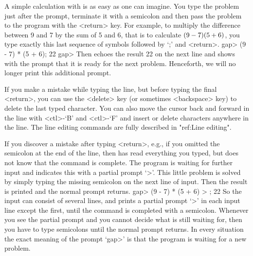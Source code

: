 A simple calculation with {\GAP} is as easy as one can imagine.  You type
the problem just after the prompt, terminate it with a semicolon and then
pass the problem to the  program with the <return> key.  For  example, to
multiply the difference between 9 and 7 by the sum of 5 and 6, that is to
calculate  $(9 - 7) \* (5 + 6)$, you type exactly this  last sequence  of
symbols followed by `;' and <return>.
\beginexample
    gap> (9 - 7) * (5 + 6);
    22
    gap> 
\endexample
Then {\GAP} echoes   the result 22 on the   next line and shows with  the
prompt  that it is ready  for the  next problem.  Henceforth,  we will no
longer print this additional prompt.

%
If you make a mistake while typing the  line, but before typing the final
<return>, you can use the <delete> key  (or sometimes <backspace> key) to
delete the last typed  character. You can  also move the cursor  back and
forward  in the line  with <ctl>-`B' and  <ctl>-`F' and  insert or delete
characters  anywhere  in the line.  The  line editing  commands are fully
described in "ref:Line editing".

If you discover a mistake after typing <return>, e.g., if you omitted the
semicolon  at the end of the  line, then {\GAP}  has  read everything you
typed, but does  not know that the command   is complete. The  program is
waiting for further input and  indicates this with  a partial prompt `>'.
This little  problem is solved by simply  typing the missing semicolon on
the next line of input. Then the result is  printed and the normal prompt
returns.
\beginexample
    gap> (9 - 7) * (5 + 6)
    > ;
    22 
\endexample
So the input can consist of several lines, and {\GAP} prints a partial
prompt `>' in each input line except the first, until the command is
completed with a semicolon.
Whenever you see the partial prompt and you cannot decide what {\GAP} is
still  waiting for, then  you have  to type  semicolons  until the normal
prompt returns.
In  every situation the exact meaning of the prompt `gap>' is that the
program is waiting for a new problem.

